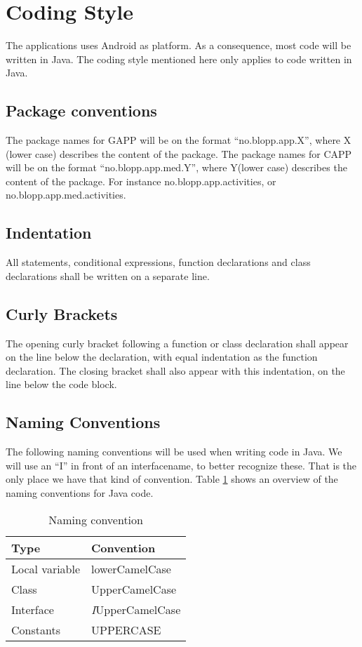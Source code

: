 \section{Coding Style}
The applications uses Android as platform. As a consequence, most code will be
written in Java. The coding style mentioned here only applies to code written
in  Java. 

\subsection{Package conventions}
The package names for GAPP will be on the format ``no.blopp.app.X'', where X (lower case) describes the content of the package. 
The package names for CAPP will be on the format ``no.blopp.app.med.Y'', where Y(lower case) describes the content of the package.
For instance no.blopp.app.activities, or no.blopp.app.med.activities. 

\subsection{Indentation}
All statements, conditional expressions, function declarations and class
declarations shall be written on a separate line. 

\subsection{Curly Brackets}
The opening curly bracket following a function or class declaration shall appear
on the line below the declaration, with equal indentation as the function
declaration. The closing bracket shall also appear with this indentation, on
the line below the code block.

\subsection{Naming Conventions}
The following naming conventions will be used when writing code in Java. We will
use an ``I'' in front of an interfacename, to better recognize these. That is
the only place we have that kind of convention. Table \ref{tab:javaNamingConventions}
shows an overview of the naming conventions for Java code.

\begin{table}
	\begin{center}
		\begin{tabular}{|p{4cm}|p{4cm}|}   
			\hline      
			\bf{Type} & \bf{Convention} \\ 
			\hline
				Local variable & lowerCamelCase \\     
			\hline
			 	Class & UpperCamelCase \\
			\hline
			 	Interface & \emph{I}UpperCamelCase \\
			\hline
			 	Constants & UPPERCASE \\
			\hline
		\end{tabular}
	\end{center}
	\caption{Naming convention}
	\label{tab:javaNamingConventions}
\end{table}

